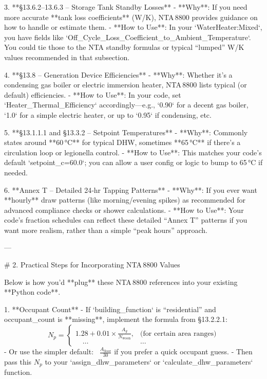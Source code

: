 3. **\S13.6.2–13.6.3 – Storage Tank Standby Losses**  
   - **Why**: If you need more accurate **tank loss coefficients** (W/K), NTA 8800 provides guidance on how to handle or estimate them.  
   - **How to Use**: In your `WaterHeater:Mixed`, you have fields like `Off_Cycle_Loss_Coefficient_to_Ambient_Temperature`. You could tie those to the NTA standby formulas or typical “lumped” W/K values recommended in that subsection.

4. **\S13.8 – Generation Device Efficiencies**  
   - **Why**: Whether it’s a condensing gas boiler or electric immersion heater, NTA 8800 lists typical (or default) efficiencies.  
   - **How to Use**: In your code, set `Heater_Thermal_Efficiency` accordingly—e.g., `0.90` for a decent gas boiler, `1.0` for a simple electric heater, or up to `0.95` if condensing, etc.

5. **\S13.1.1.1 and \S13.3.2 – Setpoint Temperatures**  
   - **Why**: Commonly states around **60 °C** for typical DHW, sometimes **65 °C** if there’s a circulation loop or legionella control.  
   - **How to Use**: This matches your code’s default `setpoint_c=60.0`; you can allow a user config or logic to bump to 65 °C if needed.

6. **Annex T – Detailed 24‐hr Tapping Patterns**  
   - **Why**: If you ever want **hourly** draw patterns (like morning/evening spikes) as recommended for advanced compliance checks or shower calculations.  
   - **How to Use**: Your code’s fraction schedules can reflect these detailed “Annex T” patterns if you want more realism, rather than a simple “peak hours” approach.

---

# 2. Practical Steps for Incorporating NTA 8800 Values

Below is how you’d **plug** these NTA 8800 references into your existing **Python code**.

1. **Occupant Count**  
   - If `building_function` is “residential” and occupant_count is **missing**, implement the formula from \S13.2.2.1:  
     \[
       N_{p} = 
       \begin{cases}
         1.28 + 0.01 \times \frac{A_{g}}{N_{\text{woon}}}, & \text{(for certain area ranges)}\\
         \quad \dots & \dots
       \end{cases}
     \]  
   - Or use the simpler default: ~\( \frac{A_{\text{floor}}}{30} \) if you prefer a quick occupant guess.  
   - Then pass this \(N_{p}\) to your `assign_dhw_parameters` or `calculate_dhw_parameters` function.

